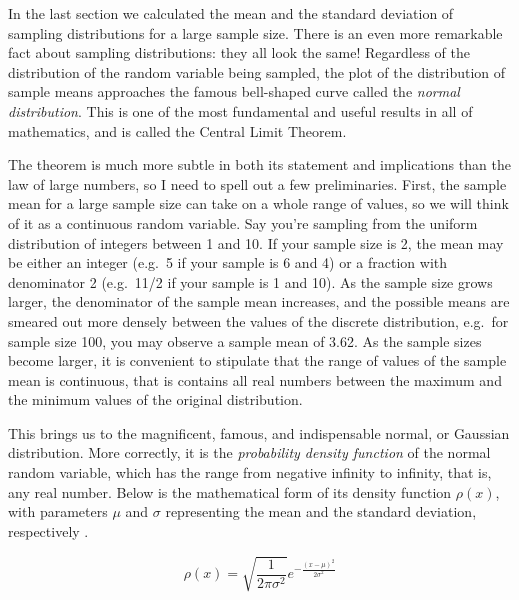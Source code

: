 \documentclass[
  letterpaper,
  DIV=11,
  numbers=noendperiod]{scrreprt}
\begin{document}
In the last section we calculated the mean and the standard deviation of
sampling distributions for a large sample size. There is an even more
remarkable fact about sampling distributions: they all look the same!
Regardless of the distribution of the random variable being sampled, the
plot of the distribution of sample means approaches the famous
bell-shaped curve called the \emph{normal distribution}. This is one of
the most fundamental and useful results in all of mathematics, and is
called the Central Limit Theorem.

The theorem is much more subtle in both its statement and implications
than the law of large numbers, so I need to spell out a few
preliminaries. First, the sample mean for a large sample size can take
on a whole range of values, so we will think of it as a continuous
random variable. Say you're sampling from the uniform distribution of
integers between 1 and 10. If your sample size is 2, the mean may be
either an integer (e.g.~5 if your sample is 6 and 4) or a fraction with
denominator 2 (e.g.~11/2 if your sample is 1 and 10). As the sample size
grows larger, the denominator of the sample mean increases, and the
possible means are smeared out more densely between the values of the
discrete distribution, e.g.~for sample size 100, you may observe a
sample mean of 3.62. As the sample sizes become larger, it is convenient
to stipulate that the range of values of the sample mean is continuous,
that is contains all real numbers between the maximum and the minimum
values of the original distribution.

This brings us to the magnificent, famous, and indispensable normal, or
Gaussian distribution. More correctly, it is the \emph{probability
density function} of the normal random variable, which has the range
from negative infinity to infinity, that is, any real number. Below is
the mathematical form of its density function \(\rho(x)\), with
parameters \(\mu\) and \(\sigma\) representing the mean and the standard
deviation, respectively \cite{whitlock_analysis_2008}.

\[\rho(x) = \sqrt{\frac{1}{2\pi \sigma^2}} e^{-\frac{(x-\mu)^2}{2 \sigma^2}}\]
\end{document}
